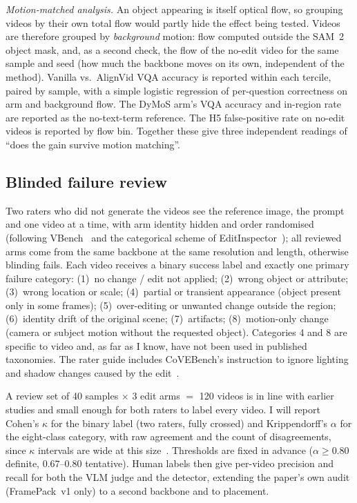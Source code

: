 \documentclass[10pt,a4paper]{article}
\begin{document}
\emph{Motion-matched analysis.} An object appearing is itself optical flow, so grouping videos by their own total flow would partly hide the effect being tested. Videos are therefore grouped by \emph{background} motion: flow computed outside the SAM~2 object mask, and, as a second check, the flow of the no-edit video for the same sample and seed (how much the backbone moves on its own, independent of the method). Vanilla vs.\ AlignVid VQA accuracy is reported within each tercile, paired by sample, with a simple logistic regression of per-question correctness on arm and background flow. The DyMoS arm's VQA accuracy and in-region rate are reported as the no-text-term reference. The H5 false-positive rate on no-edit videos is reported by flow bin. Together these give three independent readings of ``does the gain survive motion matching''.

\subsection{Blinded failure review}

Two raters who did not generate the videos see the reference image, the prompt and one video at a time, with arm identity hidden and order randomised (following VBench~\cite{vbench} and the categorical scheme of EditInspector~\cite{editinspector}); all reviewed arms come from the same backbone at the same resolution and length, otherwise blinding fails. Each video receives a binary success label and exactly one primary failure category: (1)~no change / edit not applied; (2)~wrong object or attribute; (3)~wrong location or scale; (4)~partial or transient appearance (object present only in some frames); (5)~over-editing or unwanted change outside the region; (6)~identity drift of the original scene; (7)~artifacts; (8)~motion-only change (camera or subject motion without the requested object). Categories 4 and 8 are specific to video and, as far as I know, have not been used in published taxonomies. The rater guide includes CoVEBench's instruction to ignore lighting and shadow changes caused by the edit~\cite{covebench}.

A review set of 40 samples $\times$ 3 edit arms $=$ 120 videos is in line with earlier studies and small enough for both raters to label every video. I will report Cohen's $\kappa$ for the binary label (two raters, fully crossed) and Krippendorff's $\alpha$ for the eight-class category, with raw agreement and the count of disagreements, since $\kappa$ intervals are wide at this size~\cite{hallgren}. Thresholds are fixed in advance ($\alpha \ge 0.80$ definite, $0.67$--$0.80$ tentative). Human labels then give per-video precision and recall for both the VLM judge and the detector, extending the paper's own audit (FramePack~v1 only) to a second backbone and to placement.
\end{document}
